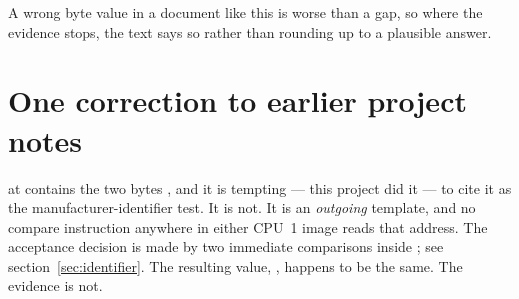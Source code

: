 A wrong byte value in a document like this is worse than a gap, so where the evidence
stops, the text says so rather than rounding up to a plausible answer.

\section{One correction to earlier project notes}
\begin{tcolorbox}[colback=red!4!white,colframe=red!50!black,title=\textbf{The label
\sym{MIDI\_SysExHeader} does not do what its name suggests}]
 at  contains the two bytes , and it is
tempting --- this project did it --- to cite it as the manufacturer-identifier test. It is
not. It is an \emph{outgoing} template, and no compare instruction anywhere in either
CPU~1 image reads that address. The acceptance decision is made by two immediate
comparisons inside ; see section~\ref{sec:identifier}. The
resulting value, , happens to be the same. The evidence is not.
\end{tcolorbox}
